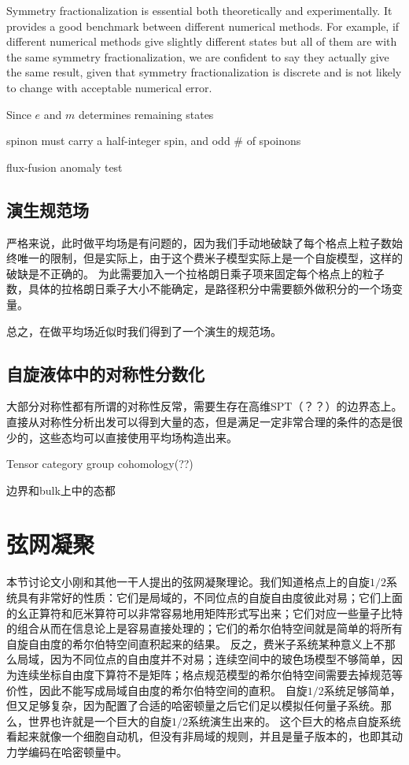 \documentclass[hyperref, UTF8, a4paper]{ctexart}
\begin{document}
Symmetry fractionalization is essential both theoretically and experimentally. It provides a good benchmark between different numerical methods. For example, if different numerical methods give slightly different states but all of them are with the same symmetry fractionalization, we are confident to say they actually give the same result, given that symmetry fractionalization is discrete and is not likely to change with acceptable numerical error.

Since $e$ and $m$ determines remaining states

spinon must carry a half-integer spin, and odd # of spoinons 

flux-fusion anomaly test

\subsection{演生规范场}

严格来说，此时做平均场是有问题的，因为我们手动地破缺了每个格点上粒子数始终唯一的限制，但是实际上，由于这个费米子模型实际上是一个自旋模型，这样的破缺是不正确的。
为此需要加入一个拉格朗日乘子项来固定每个格点上的粒子数，具体的拉格朗日乘子大小不能确定，是路径积分中需要额外做积分的一个场变量。

总之，在做平均场近似时我们得到了一个演生的规范场。

\subsection{自旋液体中的对称性分数化}

大部分对称性都有所谓的对称性反常，需要生存在高维SPT（？？）的边界态上。
直接从对称性分析出发可以得到大量的态，但是满足一定非常合理的条件的态是很少的，这些态均可以直接使用平均场构造出来。

Tensor category group cohomology(??)

边界和bulk上中的态都

\section{弦网凝聚}

本节讨论文小刚和其他一干人提出的弦网凝聚理论。我们知道格点上的自旋$1/2$系统具有非常好的性质：它们是局域的，不同位点的自旋自由度彼此对易；它们上面的幺正算符和厄米算符可以非常容易地用矩阵形式写出来；它们对应一些量子比特的组合从而在信息论上是容易直接处理的；它们的希尔伯特空间就是简单的将所有自旋自由度的希尔伯特空间直积起来的结果。
反之，费米子系统某种意义上不那么局域，因为不同位点的自由度并不对易；连续空间中的玻色场模型不够简单，因为连续坐标自由度下算符不是矩阵；格点规范模型的希尔伯特空间需要去掉规范等价性，因此不能写成局域自由度的希尔伯特空间的直积。
自旋$1/2$系统足够简单，但又足够复杂，因为配置了合适的哈密顿量之后它们足以模拟任何量子系统。那么，世界也许就是一个巨大的自旋$1/2$系统演生出来的。
这个巨大的格点自旋系统看起来就像一个细胞自动机，但没有非局域的规则，并且是量子版本的，也即其动力学编码在哈密顿量中。
\end{document}
